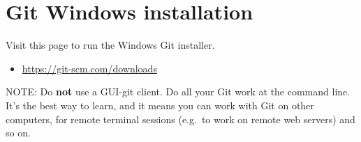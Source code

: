 \documentclass[a4paperpaper,openright]{book}
\providecommand{\tightlist}{%
  \setlength{\itemsep}{0pt}\setlength{\parskip}{0pt}}
\begin{document}
\hypertarget{git-windows-installation}{%
\section{Git Windows installation}\label{git-windows-installation}}

Visit this page to run the Windows Git installer.

\begin{itemize}
\tightlist
\item
  \url{https://git-scm.com/downloads}
\end{itemize}

NOTE: Do \textbf{not} use a GUI-git client. Do all your Git work at the
command line. It's the best way to learn, and it means you can work with
Git on other computers, for remote terminal sessions (e.g.~to work on
remote web servers) and so on.
\end{document}
